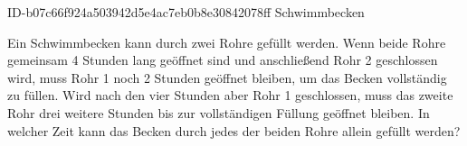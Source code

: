 \begin{exercise}
      {ID-b07c66f924a503942d5e4ac7eb0b8e30842078ff}
      {Schwimmbecken}
  \ifproblem\problem\par
    Ein Schwimmbecken kann durch zwei Rohre gefüllt werden. Wenn beide Rohre
    gemeinsam 4 Stunden lang geöffnet sind und anschließend Rohr 2 geschlossen
    wird, muss Rohr 1 noch 2 Stunden geöffnet bleiben, um das Becken vollständig
    zu füllen. Wird nach den vier Stunden aber Rohr 1 geschlossen, muss das zweite
    Rohr drei weitere Stunden bis zur vollständigen Füllung geöffnet bleiben.
    In welcher Zeit kann das Becken durch jedes der beiden Rohre allein gefüllt
    werden?
  \fi
\end{exercise}
